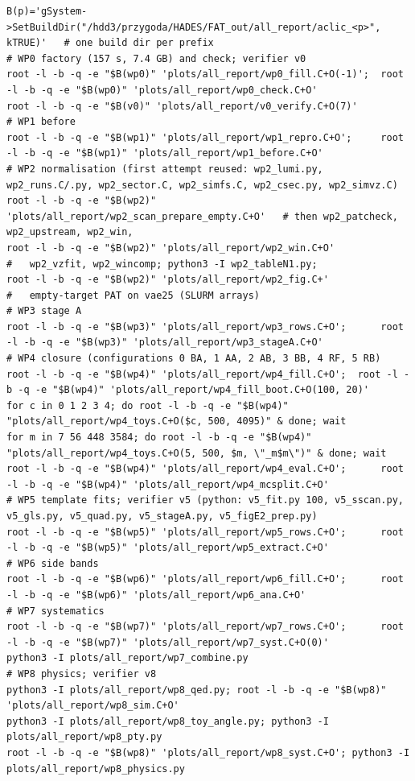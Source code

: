 \documentclass[11pt,a4paper]{article}
\begin{document}
\begin{lstlisting}
B(p)='gSystem->SetBuildDir("/hdd3/przygoda/HADES/FAT_out/all_report/aclic_<p>", kTRUE)'   # one build dir per prefix
# WP0 factory (157 s, 7.4 GB) and check; verifier v0
root -l -b -q -e "$B(wp0)" 'plots/all_report/wp0_fill.C+O(-1)';  root -l -b -q -e "$B(wp0)" 'plots/all_report/wp0_check.C+O'
root -l -b -q -e "$B(v0)" 'plots/all_report/v0_verify.C+O(7)'
# WP1 before
root -l -b -q -e "$B(wp1)" 'plots/all_report/wp1_repro.C+O';     root -l -b -q -e "$B(wp1)" 'plots/all_report/wp1_before.C+O'
# WP2 normalisation (first attempt reused: wp2_lumi.py, wp2_runs.C/.py, wp2_sector.C, wp2_simfs.C, wp2_csec.py, wp2_simvz.C)
root -l -b -q -e "$B(wp2)" 'plots/all_report/wp2_scan_prepare_empty.C+O'   # then wp2_patcheck, wp2_upstream, wp2_win,
root -l -b -q -e "$B(wp2)" 'plots/all_report/wp2_win.C+O'                  #   wp2_vzfit, wp2_wincomp; python3 -I wp2_tableN1.py;
root -l -b -q -e "$B(wp2)" 'plots/all_report/wp2_fig.C+'                   #   empty-target PAT on vae25 (SLURM arrays)
# WP3 stage A
root -l -b -q -e "$B(wp3)" 'plots/all_report/wp3_rows.C+O';      root -l -b -q -e "$B(wp3)" 'plots/all_report/wp3_stageA.C+O'
# WP4 closure (configurations 0 BA, 1 AA, 2 AB, 3 BB, 4 RF, 5 RB)
root -l -b -q -e "$B(wp4)" 'plots/all_report/wp4_fill.C+O';  root -l -b -q -e "$B(wp4)" 'plots/all_report/wp4_fill_boot.C+O(100, 20)'
for c in 0 1 2 3 4; do root -l -b -q -e "$B(wp4)" "plots/all_report/wp4_toys.C+O($c, 500, 4095)" & done; wait
for m in 7 56 448 3584; do root -l -b -q -e "$B(wp4)" "plots/all_report/wp4_toys.C+O(5, 500, $m, \"_m$m\")" & done; wait
root -l -b -q -e "$B(wp4)" 'plots/all_report/wp4_eval.C+O';      root -l -b -q -e "$B(wp4)" 'plots/all_report/wp4_mcsplit.C+O'
# WP5 template fits; verifier v5 (python: v5_fit.py 100, v5_sscan.py, v5_gls.py, v5_quad.py, v5_stageA.py, v5_figE2_prep.py)
root -l -b -q -e "$B(wp5)" 'plots/all_report/wp5_rows.C+O';      root -l -b -q -e "$B(wp5)" 'plots/all_report/wp5_extract.C+O'
# WP6 side bands
root -l -b -q -e "$B(wp6)" 'plots/all_report/wp6_fill.C+O';      root -l -b -q -e "$B(wp6)" 'plots/all_report/wp6_ana.C+O'
# WP7 systematics
root -l -b -q -e "$B(wp7)" 'plots/all_report/wp7_rows.C+O';      root -l -b -q -e "$B(wp7)" 'plots/all_report/wp7_syst.C+O(0)'
python3 -I plots/all_report/wp7_combine.py
# WP8 physics; verifier v8
python3 -I plots/all_report/wp8_qed.py; root -l -b -q -e "$B(wp8)" 'plots/all_report/wp8_sim.C+O'
python3 -I plots/all_report/wp8_toy_angle.py; python3 -I plots/all_report/wp8_pty.py
root -l -b -q -e "$B(wp8)" 'plots/all_report/wp8_syst.C+O'; python3 -I plots/all_report/wp8_physics.py

\end{lstlisting}
\end{document}
